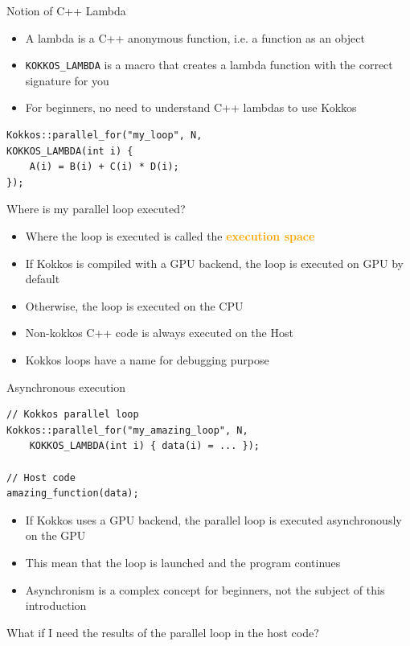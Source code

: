 \documentclass[aspectratio=169]{beamer}
\begin{document}
\begin{frame}[fragile]{Notion of C++ Lambda}
    \begin{itemize}
        \item A lambda is a C++ anonymous function, i.e. a function as an object
        \item \texttt{KOKKOS\_LAMBDA} is a macro that creates a lambda function with the correct signature for you
        \item For beginners, no need to understand C++ lambdas to use Kokkos
    \end{itemize}
    \begin{verbatim}
Kokkos::parallel_for("my_loop", N,
KOKKOS_LAMBDA(int i) {
    A(i) = B(i) + C(i) * D(i);
});
    \end{verbatim}
\end{frame}


\begin{frame}{Where is my parallel loop executed?}
    \begin{itemize}
        \item Where the loop is executed is called the \textcolor{orange}{\textbf{execution space}}
        \item If Kokkos is compiled with a GPU backend, the loop is executed on GPU by default
        \item Otherwise, the loop is executed on the CPU
        \item Non-kokkos C++ code is always executed on the Host
        \item Kokkos loops have a name for debugging purpose
    \end{itemize}
\end{frame}


\begin{frame}[fragile]{Asynchronous execution}
    \begin{verbatim}
// Kokkos parallel loop
Kokkos::parallel_for("my_amazing_loop", N,
    KOKKOS_LAMBDA(int i) { data(i) = ... });

// Host code
amazing_function(data);
    \end{verbatim}
    \begin{itemize}
        \item If Kokkos uses a GPU backend, the parallel loop is executed asynchronously on the GPU
        \item This mean that the loop is launched and the program continues
        \item Asynchronism is a complex concept for beginners, not the subject of this introduction
    \end{itemize}

     What if I need the results of the parallel loop in the host code?
\end{frame}
\end{document}
